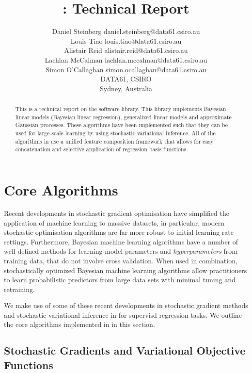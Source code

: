 \documentclass[11pt, oneside]{article}
\title{\revrand: Technical Report}
\author{\name Daniel Steinberg \email daniel.steinberg@data61.csiro.au \\
        \name Louis Tiao \email louis.tiao@data61.csiro.au \\
        \name Alistair Reid \email alistair.reid@data61.csiro.au \\
        \name Lachlan McCalman \email lachlan.mccalman@data61.csiro.au \\
        \name Simon O'Callaghan \email simon.ocallaghan@data61.csiro.au \\
        \addr DATA61, CSIRO \\
        Sydney, Australia}
\date{}
\begin{document}
\maketitle

\begin{abstract}
    This is a technical report on the \revrand software library. This
    library implements Bayesian linear models (Bayesian linear regression),
    generalized linear models and approximate Gaussian processes. These
    algorithms have been implemented such that they can be used for large-scale
    learning by using stochastic variational inference. All of the algorithms
    in \revrand use a unified feature composition framework that allows
    for easy concatenation and selective application of regression basis
    functions.
\end{abstract}

\tableofcontents

\section{Core Algorithms}

Recent developments in stochastic gradient optimisation have simplified the
application of machine learning to massive datasets, in particular, modern
stochastic optimisation algorithms are far more robust to initial learning rate
settings. Furthermore, Bayesian machine learning algorithms have a number of
well defined methods for learning model parameters and \emph{hyperparameters}
from training data, that do not involve cross validation. When used in
combination, stochastically optimized Bayesian machine learning algorithms
allow practitioners to learn probabilistic predictors from large data sets with
minimal tuning and retraining.

We make use of some of these recent developments in stochastic gradient methods
and stochastic variational inference in \revrand for supervisd regression
tasks. We outline the core algorithms implemented in \revrand in this section.

\subsection{Stochastic Gradients and Variational Objective Functions}
\label{sub:stochvar}
\end{document}
